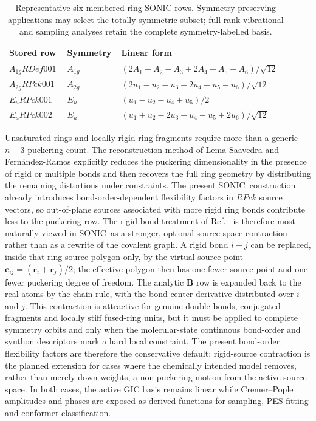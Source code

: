 \documentclass[journal=jctcce,manuscript=article,layout=traditional]{achemso}
\newcommand{\SONIC}{SONIC}
\newcommand{\Bmat}{\mathbf{B}}
\theoremstyle{definition}
\begin{document}
\begin{table}[htbp]
\centering
\small
\caption{Representative six-membered-ring SONIC rows.  Symmetry-preserving
applications may select the totally symmetric subset; full-rank vibrational
and sampling analyses retain the complete symmetry-labelled basis.}
\label{tab:ring-coordinate-examples}
\begin{tabular}{@{}p{0.20\linewidth}p{0.14\linewidth}p{0.58\linewidth}@{}}
\toprule
Stored row & Symmetry & Linear form \\
\midrule
\(A_{1g}RDef001\) & \(A_{1g}\) &
\(\left(2A_1-A_2-A_3+2A_4-A_5-A_6\right)/\sqrt{12}\) \\
\midrule
\(A_{2g}RPck001\) & \(A_{2g}\) &
\(\left(2u_1-u_2-u_3+2u_4-u_5-u_6\right)/\sqrt{12}\) \\
\midrule
\(E_uRPck001\) & \(E_u\) &
\(\left(u_1-u_2-u_4+u_5\right)/2\) \\
\midrule
\(E_uRPck002\) & \(E_u\) &
\(\left(u_1+u_2-2u_3-u_4-u_5+2u_6\right)/\sqrt{12}\) \\
\bottomrule
\end{tabular}
\end{table}

Unsaturated rings and locally rigid ring fragments require more than a generic
\(n-3\) puckering count.  The reconstruction method of Lema-Saavedra and
Fern{\'a}ndez-Ramos explicitly reduces the puckering dimensionality in the
presence of rigid or multiple bonds and then recovers the full ring geometry by
distributing the remaining distortions under constraints.\cite{LemaSaavedraFernandezRamos2026RingCP}
The present \SONIC\ construction already introduces bond-order-dependent
flexibility factors in \(RPck\) source vectors, so out-of-plane sources
associated with more rigid ring bonds contribute less to the puckering row.
The rigid-bond treatment of
Ref.~ is therefore most naturally
viewed in \SONIC\ as a stronger, optional source-space contraction rather than as
a rewrite of the covalent graph.  A rigid bond \(i-j\) can be replaced, inside
that ring source polygon only, by the virtual source point
\(\mathbf{c}_{ij}=(\mathbf{r}_i+\mathbf{r}_j)/2\); the effective polygon then
has one fewer source point and one fewer puckering degree of freedom.  The
analytic \(\Bmat\) row is expanded back to the real atoms by the chain rule,
with the bond-center derivative distributed over \(i\) and \(j\).  This
contraction is attractive for genuine double bonds, conjugated fragments and
locally stiff fused-ring units, but it must be applied to complete symmetry
orbits and only when the molecular-state continuous bond-order and synthon
descriptors mark a hard local constraint.  The present bond-order flexibility factors are
therefore the conservative default; rigid-source contraction is the planned
extension for cases where the chemically intended model removes, rather than
merely down-weights, a non-puckering motion from the active source space.  In
both cases, the active GIC basis remains linear while Cremer--Pople amplitudes
and phases are exposed as derived functions for sampling, PES fitting and
conformer classification.
\end{document}
